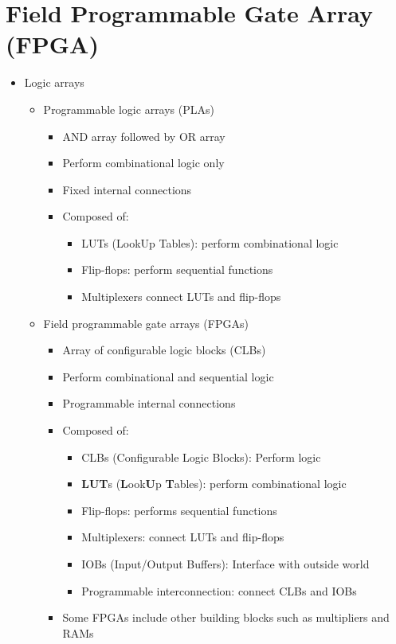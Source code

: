 \documentclass[a4paper]{article}
\begin{document}
\section{Field Programmable Gate Array (FPGA)}
\begin{itemize}
\item Logic arrays
\begin{itemize}
\item Programmable logic arrays (PLAs)
\begin{itemize}
\item AND array followed by OR array
\item Perform combinational logic only
\item Fixed internal connections
\item Composed of:
\begin{itemize}
\item LUTs (LookUp Tables): perform combinational logic
\item Flip-flops: perform sequential functions
\item Multiplexers connect LUTs and flip-flops
\end{itemize}
\end{itemize}
\item Field programmable gate arrays (FPGAs)
\begin{itemize}
\item Array of configurable logic blocks (CLBs)
\item Perform combinational and sequential logic
\item Programmable internal connections
\item Composed of:
\begin{itemize}
\item CLBs (Configurable Logic Blocks): Perform logic
\item \textbf{LUT}s (\textbf{L}ook\textbf{U}p \textbf{T}ables): perform combinational logic
\item Flip-flops: performs sequential functions
\item Multiplexers: connect LUTs and flip-flops
\item IOBs (Input/Output Buffers): Interface with outside world
\item Programmable interconnection: connect CLBs and IOBs
\end{itemize}
\item Some FPGAs include other building blocks such as multipliers and RAMs
\end{itemize}
\end{itemize}
\end{itemize}
\end{document}
